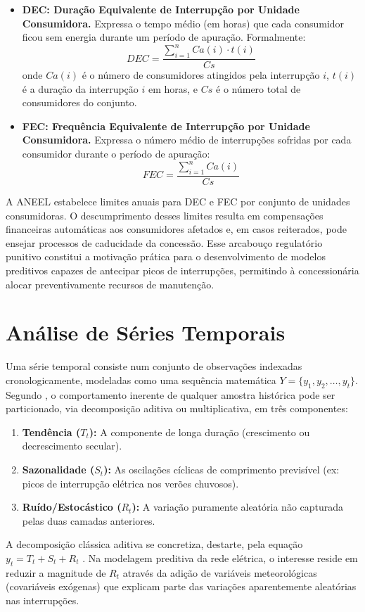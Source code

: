 \begin{itemize}
    \item \textbf{DEC: Duração Equivalente de Interrupção por Unidade Consumidora.} Expressa o tempo médio (em horas) que cada consumidor ficou sem energia durante um período de apuração. Formalmente:
    \begin{equation}
        DEC = \frac{\sum_{i=1}^{n} Ca(i) \cdot t(i)}{Cs}
    \end{equation}
    onde $Ca(i)$ é o número de consumidores atingidos pela interrupção $i$, $t(i)$ é a duração da interrupção $i$ em horas, e $Cs$ é o número total de consumidores do conjunto.

    \item \textbf{FEC: Frequência Equivalente de Interrupção por Unidade Consumidora.} Expressa o número médio de interrupções sofridas por cada consumidor durante o período de apuração:
    \begin{equation}
        FEC = \frac{\sum_{i=1}^{n} Ca(i)}{Cs}
    \end{equation}
\end{itemize}

A ANEEL estabelece limites anuais para DEC e FEC por conjunto de unidades consumidoras. O descumprimento desses limites resulta em compensações financeiras automáticas aos consumidores afetados e, em casos reiterados, pode ensejar processos de caducidade da concessão. Esse arcabouço regulatório punitivo constitui a motivação prática para o desenvolvimento de modelos preditivos capazes de antecipar picos de interrupções, permitindo à concessionária alocar preventivamente recursos de manutenção.

\section{Análise de Séries Temporais}
Uma série temporal consiste num conjunto de observações indexadas cronologicamente, modeladas como uma sequência matemática $Y = \{y_1, y_2, \dots, y_t\}$. Segundo \cite{box2015time}, o comportamento inerente de qualquer amostra histórica pode ser particionado, via decomposição aditiva ou multiplicativa, em três componentes:
\begin{enumerate}
    \item \textbf{Tendência ($T_t$):} A componente de longa duração (crescimento ou decrescimento secular).
    \item \textbf{Sazonalidade ($S_t$):} As oscilações cíclicas de comprimento previsível (ex: picos de interrupção elétrica nos verões chuvosos).
    \item \textbf{Ruído/Estocástico ($R_t$):} A variação puramente aleatória não capturada pelas duas camadas anteriores.
\end{enumerate}
A decomposição clássica aditiva se concretiza, destarte, pela equação $y_t = T_t + S_t + R_t$ \cite{hyndman2018forecasting}. Na modelagem preditiva da rede elétrica, o interesse reside em reduzir a magnitude de $R_t$ através da adição de variáveis meteorológicas (covariáveis exógenas) que explicam parte das variações aparentemente aleatórias nas interrupções.

